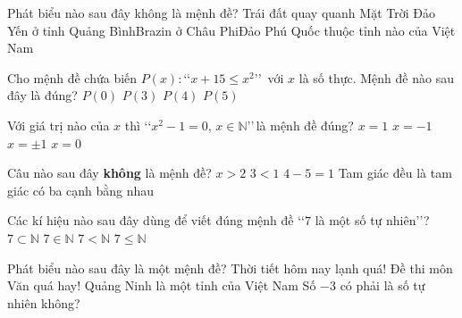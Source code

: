 \begin{ex}%
	Phát biểu nào sau  đây không là mệnh đề?
	 \choice
		{Trái  đất quay quanh Mặt Trời}
	{Đảo Yến ở tỉnh Quảng Bình}{Brazin ở Châu Phi}{\True Đảo Phú Quốc  thuộc tỉnh nào của Việt Nam}
\end{ex}

\begin{ex}%
	Cho mệnh đề chứa biến $P(x)\colon$\lq\lq $x+15\le x^2$\rq\rq\, với $x$ là số thực. Mệnh đề nào sau  đây là đúng?
	\choice 
		 {$P(0)$}
		{$P(3)$} 
		{$P(4)$} 
		{\True  $P(5)$}
\end{ex}

\begin{ex}%
	Với giá trị nào của  $x$ thì \lq\lq $x^2-1 = 0$, $x \in \mathbb{N}$\rq\rq \,là mệnh đề đúng?
	\choice 
		{\True $x = 1$} 
		{$x =  -1$}
		{$x =\pm 1$} 
		{$x =  0$}
\end{ex}

\begin{ex}%
	Câu nào sau  đây \textbf{không} là mệnh đề?
	\choice 
		{\True $x >  2$}
		{$3  < 1$}
		{$4 - 5 = 1$} 
		{Tam  giác đều là tam giác có ba cạnh bằng nhau}
\end{ex}

\begin{ex}%
	Các kí  hiệu nào sau đây dùng để viết đúng mệnh đề \lq\lq $7$ là một số tự nhiên\rq\rq?
	\choice 
		{$7\subset \mathbb{N}$} 
		 {\True $7\in \mathbb{N}$}
		 {$7 < \mathbb{N}$}
		{$7 \leq \mathbb{N}$} 
\end{ex}

\begin{ex}%
	Phát biểu nào sau đây là một  mệnh đề?
	 \choice
		 {Thời tiết hôm nay lạnh quá!}
		{Đề thi môn  Văn quá hay!}
		{\True Quảng Ninh là một tỉnh của  Việt Nam}
		{Số $-3$ có phải là số tự nhiên  không?}
\end{ex}

